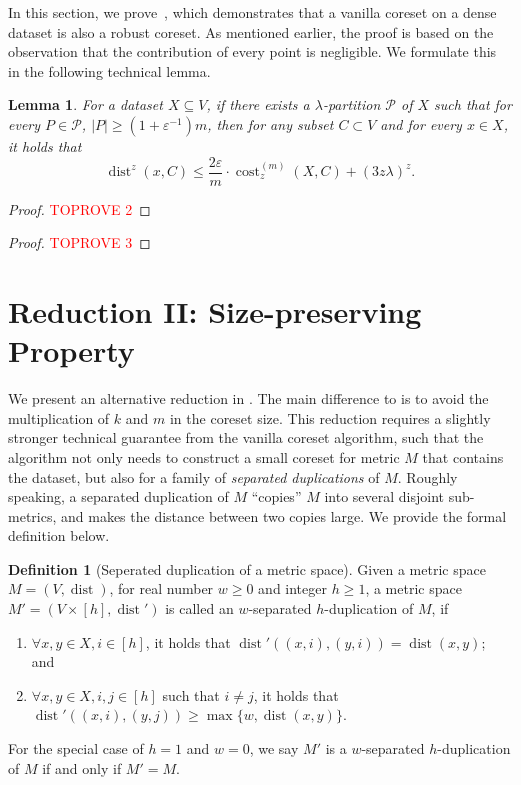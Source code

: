 \documentclass[letterpaper,11pt]{article}
\theoremstyle{plain}
\newtheorem{lemma}[theorem]{Lemma}
\theoremstyle{definition}
\newtheorem{definition}[theorem]{Definition}
\theoremstyle{remark}
\DeclareMathOperator{\cost}{cost}
\DeclareMathOperator{\dist}{dist}
\newcommand{\eps}{\varepsilon}
\newcommand{\calP}{\mathcal{P}}
\begin{document}
In this section, we prove~, which demonstrates that a vanilla coreset on a dense dataset is also a robust coreset. As mentioned earlier, the proof is based on the observation that the contribution of every point is negligible. We formulate this in the following technical lemma.

\begin{lemma}
    \label{lem:small dist}
For a dataset $X\subseteq V$, if there exists a $\lambda$-partition $\calP$ of $X$ such that for every $P\in\calP$, $|P|\ge (1+\eps^{-1})m$, then
    for any subset $C\subset V$ and for every $x\in X$, it holds that 
    \begin{equation*}
        \dist^z(x,C)\le \frac{2\eps}{m}\cdot \cost_z^{(m)}(X,C) + (3z\lambda)^z.
    \end{equation*}
\end{lemma}
\begin{proof}\textcolor{red}{TOPROVE 2}\end{proof}

\begin{proof}\textcolor{red}{TOPROVE 3}\end{proof}

 
\section{Reduction II: Size-preserving Property}
\label{sec:reduction2}

We present an alternative reduction in .
The main difference to  is to avoid the multiplication of $k$ and $m$ in the coreset size.
This reduction requires a slightly stronger technical guarantee from the vanilla coreset algorithm,
such that the algorithm not only needs to construct a small coreset for metric $M$ that contains the dataset,
but also for a family of \emph{separated duplications} of $M$.
Roughly speaking, a separated duplication of $M$ ``copies'' $M$ into several disjoint sub-metrics, and makes the distance between two copies large.  We provide the formal definition below.





\begin{definition}[Seperated duplication of a metric space]
    \label{def:separated duplication}
    Given a metric space $M=(V,\dist)$, for real number $w\ge 0$ and integer $h\ge 1$, a metric space $M'=(V\times [h],\dist')$ is called an $w$-separated $h$-duplication of $M$, if 
    \begin{enumerate}
        \item $\forall x,y\in X, i\in [h]$, it holds that $\dist'((x,i),(y,i)) = \dist(x,y)$; and
        \item $\forall x,y\in X, i,j\in [h]$ such that $i\neq j$, it holds that $\dist'((x,i),(y,j))\ge \max\{w,\dist(x,y)\}$.
    \end{enumerate}
    For the special case of $h = 1$ and $w = 0$, we say $M'$ is a $w$-separated $h$-duplication of $M$ if and only if $M'=M$.
\end{definition}
\end{document}
